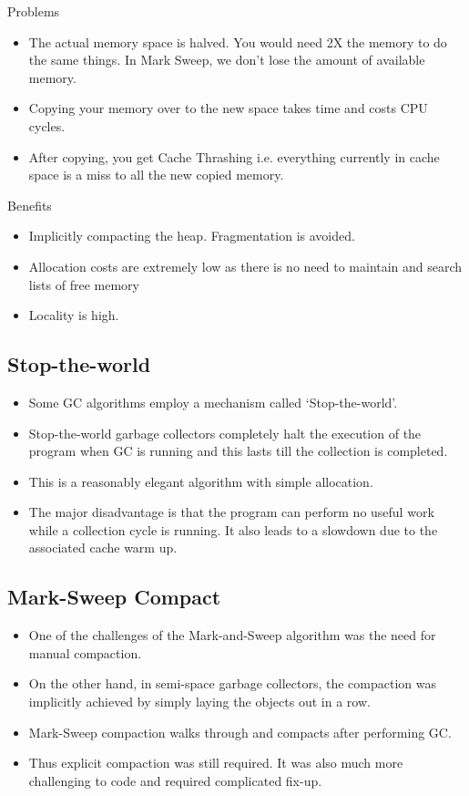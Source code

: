 \documentclass[twoside]{article}
\begin{document}
	{\large Problems}
	\begin{itemize}
		\item The actual memory space is halved. You would need 2X the memory to do the same things. In Mark Sweep, we don't lose the amount of available memory.
		\item Copying your memory over to the new space takes time and costs CPU cycles.
		\item After copying, you get Cache Thrashing i.e. everything currently in cache space is a miss to all the new copied memory.
	\end{itemize}
	
	{\large Benefits}
	\begin{itemize}
		\item Implicitly compacting the heap. Fragmentation is avoided.
		\item Allocation costs are extremely low as there is no need to maintain and search lists of free memory
		\item Locality is high.
	\end{itemize}
	
	\subsection{Stop-the-world}
	\begin{itemize}
		\item Some GC algorithms employ a mechanism called \lq Stop-the-world\rq.
		\item Stop-the-world garbage collectors completely halt the execution of the program when GC is running and this lasts till the collection is completed.
		\item This is a reasonably elegant algorithm with simple allocation.
		\item The major disadvantage is that the program can perform no useful work while a collection cycle is running. It also leads to a slowdown due to the associated cache warm up.
	\end{itemize}
	
	\subsection{Mark-Sweep Compact}
	\begin{itemize}
		\item One of the challenges of the Mark-and-Sweep algorithm was the need for manual compaction. 
		\item On the other hand, in semi-space garbage collectors, the compaction was implicitly achieved by simply laying the objects out in a row.
		\item Mark-Sweep compaction walks through and compacts after performing GC.
		\item Thus explicit compaction was still required. It was also much more challenging to code and required complicated fix-up.
	\end{itemize}
	
\end{document}

